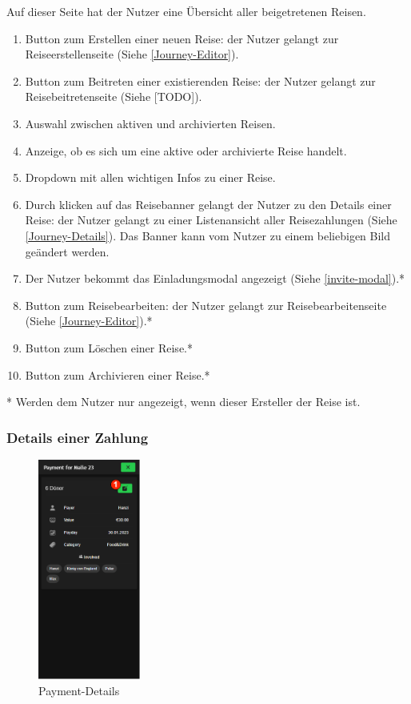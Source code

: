 Auf dieser Seite hat der Nutzer eine Übersicht aller beigetretenen Reisen.

\begin{enumerate}[label=\protect\circled{\arabic*}]
	\item Button zum Erstellen einer neuen Reise: der Nutzer gelangt zur Reiseerstellenseite  (Siehe \ref{Journey-Editor}).
	\item Button zum Beitreten einer existierenden Reise: der Nutzer gelangt zur Reisebeitretenseite (Siehe [TODO]).
	\item Auswahl zwischen aktiven und archivierten Reisen.
	\item Anzeige, ob es sich um eine aktive oder archivierte Reise handelt.
	\item Dropdown mit allen wichtigen Infos zu einer Reise.
	\item Durch klicken auf das Reisebanner gelangt der Nutzer zu  den Details einer Reise: der Nutzer gelangt zu einer Listenansicht aller Reisezahlungen  (Siehe \ref{Journey-Details}). Das Banner kann vom Nutzer zu einem beliebigen Bild geändert werden.
	\item Der Nutzer bekommt das Einladungsmodal angezeigt (Siehe \ref{invite-modal}).*
	\item Button zum Reisebearbeiten: der Nutzer gelangt zur Reisebearbeitenseite (Siehe \ref{Journey-Editor}).*
	\item Button zum Löschen einer Reise.*
	\item Button zum Archivieren einer Reise.*
\end{enumerate}
* Werden dem Nutzer nur angezeigt, wenn dieser Ersteller der Reise ist.
\subsubsection{Details einer Zahlung}\label{payment-details}
\begin{figure}[H]
	\centering
	\includegraphics[width=0.3\textwidth]{img/pages_numbers/payment-details.drawio}
	\caption[Payment-Details]{Payment-Details}
	\label{fig:payment-details}
\end{figure}

